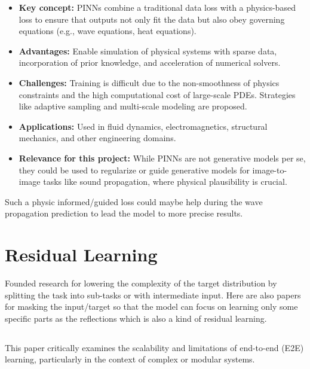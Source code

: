 			\begin{itemize}[itemsep=1mm, parsep=0pt]
				\item \textbf{Key concept:} PINNs combine a traditional data loss with a physics-based loss to ensure that outputs not only fit the data but also obey governing equations (e.g., wave equations, heat equations).
				\item \textbf{Advantages:} Enable simulation of physical systems with sparse data, incorporation of prior knowledge, and acceleration of numerical solvers.
				\item \textbf{Challenges:} Training is difficult due to the non-smoothness of physics constraints and the high computational cost of large-scale PDEs. Strategies like adaptive sampling and multi-scale modeling are proposed.
				\item \textbf{Applications:} Used in fluid dynamics, electromagnetics, structural mechanics, and other engineering domains.
				\item \textbf{Relevance for this project:} While PINNs are not generative models per se, they could be used to regularize or guide generative models for image-to-image tasks like sound propagation, where physical plausibility is crucial.
			\end{itemize}
			
			Such a physic informed/guided loss could maybe help during the wave propagation prediction to lead the model to more precise results.
			
	
	
	\newpage
	\section{Residual Learning}  %
	\label{sec:lit-complex-focus-only}
		Founded research for lowering the complexity of the target distribution by splitting the task into sub-tasks or with intermediate input. Here are also papers for masking the input/target so that the model can focus on learning only some specific parts as the reflections which is also a kind of residual learning.
	
		\subsection{}
			This paper critically examines the scalability and limitations of end-to-end (E2E) learning, particularly in the context of complex or modular systems.
			
